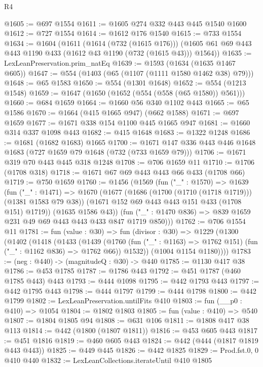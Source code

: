 \begin{lexlean}{R4}
\begin{coremodule}
@1605 := @697 @1554
@1611 := @1605 @274 @332 @443 @445 @1540 @1600
@1612 := @727 @1554
@1614 := @1612 @176 @1540
@1615 := @733 @1554
@1634 := @1604
    (@1611
      (@1614 (@732 (@1615 @176)))
      (@1605 @61 @69 @443 @443 @1190 @433 (@1612 @43 @1190 (@732 (@1615 @43))) @1564))
@1635 := LexLeanPreservation.prim_natEq
@1639 := @1593 (@1634 (@1635 @1467 @605))
@1647 := @554 (@1403 (@65 (@1107 (@1111 @1580 @1462 @38) @79)))
@1648 := @65 @1583
@1650 := @554 (@1301 @1648)
@1652 := @554 (@1213 @1548)
@1659 := @1647 (@1650 (@1652 (@554 (@558 (@65 @1580)) @561)))
@1660 := @684 @1659
@1664 := @1660 @56 @340 @1102 @443
@1665 := @65 @1586
@1670 := @1664 (@415 @1665 @947) (@662 @1588)
@1671 := @697 @1659
@1677 := @1671 @338 @154 @1100 @445 @1665 @947
@1681 := @1660 @314 @337 @1098 @443
@1682 := @415 @1648
@1683 := @1322 @1248
@1686 := @1681 (@1682 @1683) @1665
@1700 := @1671 @147 @336 @443 @446 @1648 @1683 (@727 @1659 @79 @1648 (@732 (@733 @1659 @79)))
@1706 := @1671 @319 @70 @443 @445 @318 @1248
@1708 := @706 @1659 @11
@1710 := @1706 (@1708 @318)
@1718 := @1671 @67 @69 @443 @443 @66 @433 (@1708 @66)
@1719 := @750 @1659
@1760 := @1456
    (@1569
      (fun ("_" : @1570) =>
      @1639
        (fun ("_" : @1471) =>
        @1670
          (@1677
            (@1686 (@1700 (@1710 (@1718 @1719))) (@1381 @1583 @79 @38))
            (@1671 @152 @69 @443 @443 @151 @433 (@1708 @151) @1719))
          (@1635 @1586 @43))
        (fun ("_" : @1470 @836) => @839 @1659 @231 @49 @69 @443 @443 @433 @847 @1719 @850)))
@1762 := @706 @1554 @11
@1781 := fun (value : @30) =>
  fun (divisor : @30) =>
  @1229
    (@1300
      (@1402
        (@1418
          (@1433
            (@1439
              (@1760 (fun ("_" : @1163) => @1762 @151) (fun ("_" : @1162 @836) => @1762 @66))
              @1532))
          (@1004 @1154 @1180))))
@1783 := (neg : @440) -> (magnitudeQ : @30) -> @440
@1785 := @1130 @417 @38
@1786 := @453 @1785
@1787 := @1786 @443
@1792 := @451 @1787 (@460 @1785 @443) @443
@1793 := @444 @1098
@1795 := @442 @1793 @443
@1797 := @442 @1795 @443
@1798 := @444 @1797
@1799 := @444 @1798
@1800 := @442 @1799
@1802 := LexLeanPreservation.untilFits @410
@1803 := fun (__p0 : @410) => @1054
@1804 := @1802 @1803
@1805 := fun (value : @410) => @540
@1807 := @1804 @1805 @94
@1808 := @631 @106
@1811 := @1808 @417 @38 @113
@1814 := @442 (@1800 (@1807 @1811))
@1816 := @453 @605 @443
@1817 := @451 @1816
@1819 := @460 @605 @443
@1824 := @442 (@444 (@1817 @1819 @443 @443))
@1825 := @449 @445
@1826 := @442 @1825
@1829 := Prod.fst.{0, 0} @410 @440
@1832 := LexLeanCollections.iterateUntil @410 @1805

\end{coremodule}
\end{lexlean}
